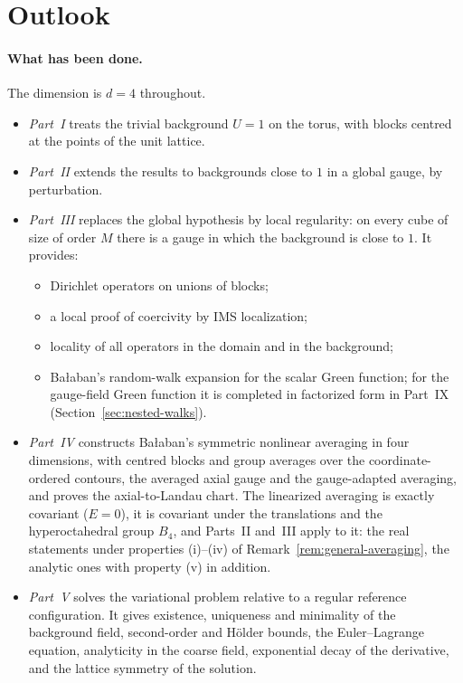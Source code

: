 \section{Outlook}\label{sec:outlook}

\paragraph{What has been done.} The dimension is $d=4$ throughout.
\begin{itemize}
\item \emph{Part~I} treats the trivial background $U=1$ on the torus, with blocks centred at the points of the unit lattice.
\item \emph{Part~II} extends the results to backgrounds close to $1$ in a global gauge, by perturbation.
\item \emph{Part~III} replaces the global hypothesis by local regularity: on every cube of size of order $M$ there is a gauge in which the background is close to $1$. It provides:
  \begin{itemize}
  \item Dirichlet operators on unions of blocks;
  \item a local proof of coercivity by IMS localization;
  \item locality of all operators in the domain and in the background;
  \item Ba\l aban's random-walk expansion for the scalar Green function; for the gauge-field Green function it is completed in factorized form in Part~IX (Section~\ref{sec:nested-walks}).
  \end{itemize}
\item \emph{Part~IV} constructs Ba\l aban's symmetric nonlinear averaging in four dimensions, with centred blocks and group averages over the coordinate-ordered contours, the averaged axial gauge and the gauge-adapted averaging, and proves the axial-to-Landau chart. The linearized averaging is exactly covariant ($E=0$), it is covariant under the translations and the hyperoctahedral group $B_4$, and Parts~II and~III apply to it: the real statements under properties (i)--(iv) of Remark~\ref{rem:general-averaging}, the analytic ones with property (v) in addition.
\item \emph{Part~V} solves the variational problem relative to a regular reference configuration. It gives existence, uniqueness and minimality of the background field, second-order and H\"older bounds, the Euler--Lagrange equation, analyticity in the coarse field, exponential decay of the derivative, and the lattice symmetry of the solution.

\end{itemize}
